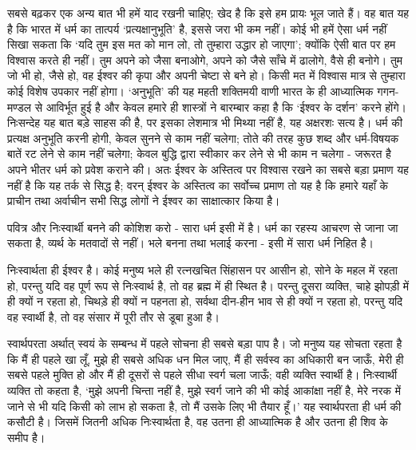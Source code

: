 सबसे बढ़कर एक अन्य बात भी हमें याद रखनी चाहिए; खेद है कि इसे हम प्रायः भूल जाते हैं। वह बात यह है कि भारत में धर्म का तात्पर्य ‘प्रत्यक्षानुभूति’ है, इससे जरा भी कम नहीं। कोई भी हमें ऐसा धर्म नहीं सिखा सकता कि ‘यदि तुम इस मत को मान लो, तो तुम्हारा उद्धार हो जाएगा’; क्योंकि ऐसी बात पर हम विश्वास करते ही नहीं। तुम अपने को जैसा बनाओगे, अपने को जैसे साँचे में ढालोगे, वैसे ही बनोगे। तुम जो भी हो, जैसे हो, वह ईश्वर की कृपा और अपनी चेष्टा से बने हो। किसी मत में विश्वास मात्र से तुम्हारा कोई विशेष उपकार नहीं होगा। ‘अनुभूति’ की यह महती शक्तिमयी वाणी भारत के ही आध्यात्मिक गगन-मण्डल से आविर्भूत हुई है और केवल हमारे ही शास्त्रों ने बारम्बार कहा है कि ‘ईश्वर के दर्शन’ करने होंगे। निःसन्देह यह बात बड़े साहस की है, पर इसका लेशमात्र भी मिथ्या नहीं है, यह अक्षरशः सत्य है। धर्म की प्रत्यक्ष अनुभूति करनी होगी, केवल सुनने से काम नहीं चलेगा; तोते की तरह कुछ शब्द और धर्म-विषयक बातें रट लेने से काम नहीं चलेगा; केवल बुद्धि द्वारा स्वीकार कर लेने से भी काम न चलेगा - जरूरत है अपने भीतर धर्म को प्रवेश कराने की। अतः ईश्वर के अस्तित्व पर विश्वास रखने का सबसे बड़ा प्रमाण यह नहीं है कि यह तर्क से सिद्ध है; वरन् ईश्वर के अस्तित्व का सर्वोच्च प्रमाण तो यह है कि हमारे यहाँ के प्राचीन तथा अर्वाचीन सभी सिद्ध लोगों ने ईश्वर का साक्षात्कार किया है। 

पवित्र और निःस्वार्थी बनने की कोशिश करो - सारा धर्म इसी में है। धर्म का रहस्य आचरण से जाना जा सकता है, व्यर्थ के मतवादों से नहीं। भले बनना तथा भलाई करना - इसी में सारा धर्म निहित है। 

निःस्वार्थता ही ईश्वर है। कोई मनुष्य भले ही रत्नखचित सिंहासन पर आसीन हो, सोने के महल में रहता हो, परन्तु यदि वह पूर्ण रूप से निःस्वार्थ है, तो वह ब्रह्म में ही स्थित है। परन्तु दूसरा व्यक्ति, चाहे झोपड़ी में ही क्यों न रहता हो, चिथड़े ही क्यों न पहनता हो, सर्वथा दीन-हीन भाव से ही क्यों न रहता हो, परन्तु यदि वह स्वार्थी है, तो वह संसार में पूरी तौर से डूबा हुआ है। 

स्वार्थपरता अर्थात् स्वयं के सम्बन्ध में पहले सोचना ही सबसे बड़ा पाप है। जो मनुष्य यह सोचता रहता है कि मैं ही पहले खा लूँ, मुझे ही सबसे अधिक धन मिल जाए, मैं ही सर्वस्व का अधिकारी बन जाऊँ, मेरी ही सबसे पहले मुक्ति हो और मैं ही दूसरों से पहले सीधा स्वर्ग चला जाऊँ; वही व्यक्ति स्वार्थी है। निःस्वार्थी व्यक्ति तो कहता है, ‘मुझे अपनी चिन्ता नहीं है, मुझे स्वर्ग जाने की भी कोई आकांक्षा नहीं है, मेरे नरक में जाने से भी यदि किसी को लाभ हो सकता है, तो मैं उसके लिए भी तैयार हूँ।’ यह स्वार्थपरता ही धर्म की कसौटी है। जिसमें जितनी अधिक निःस्वार्थता है, वह उतना ही आध्यात्मिक है और उतना ही शिव के समीप है। 

